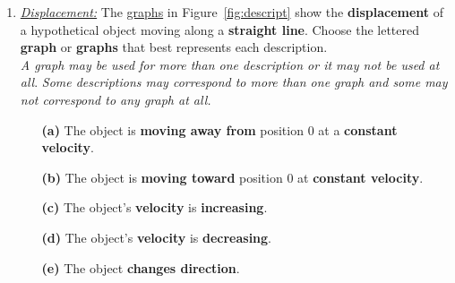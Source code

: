 \documentclass[A4,12pt]{article}
\begin{document}
\begin{enumerate}[label=\bfseries (\arabic*)]
\item \href{https://physics.info/motion-graphs/problems.shtml}{\it Displacement:} The \href{https://physics.info/motion-graphs/worksheet-choose-displacement.pdf}{graphs} in Figure~\ref{fig:descript} show the {\bf displacement} of a hypothetical object moving along a {\bf straight line}. Choose the lettered \textbf{graph} or \textbf{graphs} that best represents each description. \cite{Elert,Triguero}\\
{\it A graph may be used for more than one description or it may not be used at all}. 
{\it Some descriptions may correspond to more than one graph and some may not correspond to any graph at all.}
\begin{itemize}
    \item[\bf (a)] The object is \textbf{moving away from} position 0 at a \textbf{constant velocity}.
    \item[\bf(b)] The object is \textbf{moving toward} position 0 at \textbf{constant velocity}.
    \item[\bf(c)] The object's \textbf{velocity} is \textbf{increasing}.%
    \item[\bf (d)] The object's \textbf{velocity} is \textbf{decreasing}.%
    \item[\bf (e)] The object \textbf{changes direction}.

\end{itemize}
\end{enumerate}
\end{document}
